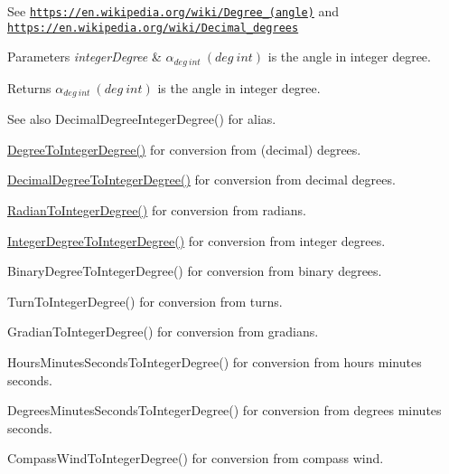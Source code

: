 See \href{https://en.wikipedia.org/wiki/Degree_(angle)}{\tt https\+://en.\+wikipedia.\+org/wiki/\+Degree\+\_\+(angle)} and \href{https://en.wikipedia.org/wiki/Decimal_degrees}{\tt https\+://en.\+wikipedia.\+org/wiki/\+Decimal\+\_\+degrees} 
\begin{DoxyParams}{Parameters}
{\em integer\+Degree} & $\alpha_{deg\ int}\ (deg\ int)$ is the angle in integer degree. \\
\hline
\end{DoxyParams}
\begin{DoxyReturn}{Returns}
$\alpha_{deg\ int}\ (deg\ int)$ is the angle in integer degree. 
\end{DoxyReturn}
\begin{DoxySeeAlso}{See also}
Decimal\+Degree\+Integer\+Degree() for alias. 

\mbox{\hyperlink{group___e_g_x_math-_angle_conversions-_degree_gaabd20f21be3c18ee423d0bc1a677c6f6}{Degree\+To\+Integer\+Degree()}} for conversion from (decimal) degrees. 

\mbox{\hyperlink{group___e_g_x_math-_angle_conversions-_decimal_degree_ga115239ea7202dbc6a6c9fba68e0ac189}{Decimal\+Degree\+To\+Integer\+Degree()}} for conversion from decimal degrees. 

\mbox{\hyperlink{group___e_g_x_math-_angle_conversions-_radian_gac84796dfdeb56235e1e338522a5f9350}{Radian\+To\+Integer\+Degree()}} for conversion from radians. 

\mbox{\hyperlink{group___e_g_x_math-_angle_conversions-_integer_degree_gac9e870bdfa60dd2bb61469fdf6eedd7c}{Integer\+Degree\+To\+Integer\+Degree()}} for conversion from integer degrees. 

Binary\+Degree\+To\+Integer\+Degree() for conversion from binary degrees. 

Turn\+To\+Integer\+Degree() for conversion from turns. 

Gradian\+To\+Integer\+Degree() for conversion from gradians. 

Hours\+Minutes\+Seconds\+To\+Integer\+Degree() for conversion from hours minutes seconds. 

Degrees\+Minutes\+Seconds\+To\+Integer\+Degree() for conversion from degrees minutes seconds. 

Compass\+Wind\+To\+Integer\+Degree() for conversion from compass wind. 
\end{DoxySeeAlso}
\mbox{\label{group___e_g_x_math-_angle_conversions-_integer_degree_ga69179d6082764595c7014805e1f6b31e}} 
